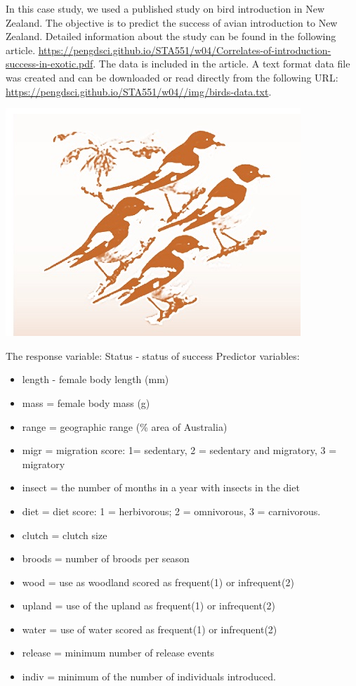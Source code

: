 \documentclass[
]{book}
\providecommand{\tightlist}{%
  \setlength{\itemsep}{0pt}\setlength{\parskip}{0pt}}
\begin{document}
In this case study, we used a published study on bird introduction in New Zealand. The objective is to predict the success of avian introduction to New Zealand. Detailed information about the study can be found in the following article. \url{https://pengdsci.github.io/STA551/w04/Correlates-of-introduction-success-in-exotic.pdf}. The data is included in the article. A text format data file was created and can be downloaded or read directly from the following URL: \href{https://pengdsci.github.io/STA551/w04/img/birds-data.txt}{https://pengdsci.github.io/STA551/w04//img/birds-data.txt}.

\begin{center}\includegraphics[width=0.8\linewidth]{img04/w04-BirdImage} \end{center}

The response variable: Status - status of success
Predictor variables:

\begin{itemize}
\tightlist
\item
  length - female body length (mm)
\item
  mass = female body mass (g)
\item
  range = geographic range (\% area of Australia)
\item
  migr = migration score: 1= sedentary, 2 = sedentary and migratory, 3 = migratory
\item
  insect = the number of months in a year with insects in the diet
\item
  diet = diet score: 1 = herbivorous; 2 = omnivorous, 3 = carnivorous.
\item
  clutch = clutch size
\item
  broods = number of broods per season
\item
  wood = use as woodland scored as frequent(1) or infrequent(2)
\item
  upland = use of the upland as frequent(1) or infrequent(2)
\item
  water = use of water scored as frequent(1) or infrequent(2)
\item
  release = minimum number of release events
\item
  indiv = minimum of the number of individuals introduced.
\end{itemize}
\end{document}
